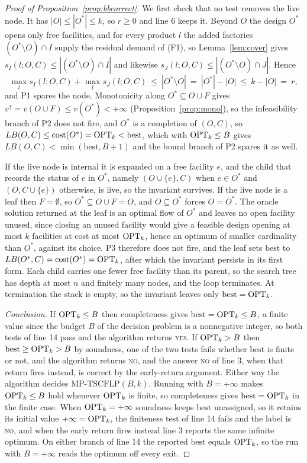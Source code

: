 \begin{proof}[Proof of Proposition~\ref{prop:bbcorrect}]
We first check that no test removes the live node. It has
$|O|\le|O^\ast|\le k$, so $r\ge 0$ and line 6 keeps it. Beyond $O$ the
design $O^\ast$ opens only free facilities, and for every product $l$
the added factories $(O^\ast\setminus O)\cap I$ supply the residual
demand of (F1), so Lemma~\ref{lem:cover} gives
$s_I(l;O,C)\le|(O^\ast\setminus O)\cap I|$ and likewise
$s_J(l;O,C)\le|(O^\ast\setminus O)\cap J|$. Hence
\[
\max_l s_I(l;O,C)+\max_l s_J(l;O,C)\ \le\ |O^\ast\setminus O|
\ =\ |O^\ast|-|O|\ \le\ k-|O|\ =\ r,
\]
and P1 spares the node. Monotonicity along $O^\ast\subseteq O\cup F$
gives $v^{\uparrow}=v(O\cup F)\le v(O^\ast)<+\infty$
(Proposition~\ref{prop:mono}), so the infeasibility branch of P2 does
not fire, and $O^\ast$ is a completion of $(O,C)$, so
$LB(O,C)\le\mathrm{cost}(O^\ast)=\mathrm{OPT}_k<\mathrm{best}$, which with
$\mathrm{OPT}_k\le B$ gives $LB(O,C)<\min(\mathrm{best},B+1)$ and the bound
branch of P2 spares it as well.

If the live node is internal it is expanded on a free facility $e$, and
the child that records the status of $e$ in $O^\ast$, namely
$(O\cup\{e\},C)$ when $e\in O^\ast$ and $(O,C\cup\{e\})$ otherwise, is
live, so the invariant survives. If the live node is a leaf then
$F=\emptyset$, so $O^\ast\subseteq O\cup F=O$, and $O\subseteq O^\ast$
forces $O=O^\ast$. The oracle solution returned at the leaf is an
optimal flow of $O^\ast$ and leaves no open facility
unused, since closing an unused facility would give a feasible design
opening at most $k$ facilities at cost at most $\mathrm{OPT}_k$, hence an
optimum of smaller cardinality than $O^\ast$, against its choice. P3
therefore does not fire, and the leaf sets $\mathrm{best}$ to
$LB(O^\ast,C)=\mathrm{cost}(O^\ast)=\mathrm{OPT}_k$, after which the invariant
persists in its first form. Each child carries one fewer free facility
than its parent, so the search tree has depth at most $n$ and finitely
many nodes, and the loop terminates. At termination the stack is empty,
so the invariant leaves only $\mathrm{best}=\mathrm{OPT}_k$.

\emph{Conclusion.} If $\mathrm{OPT}_k\le B$ then completeness gives
$\mathrm{best}=\mathrm{OPT}_k\le B$, a finite value since the budget $B$ of the
decision problem is a nonnegative integer, so both tests of line 14 pass
and the algorithm returns \textsc{yes}. If $\mathrm{OPT}_k>B$ then
$\mathrm{best}\ge\mathrm{OPT}_k>B$ by soundness, one of the two tests fails
whether $\mathrm{best}$ is finite or not, and the algorithm returns
\textsc{no}, and the answer \textsc{no} of line 3, when that return
fires instead, is correct by the early-return argument. Either
way the algorithm decides $\mathrm{MP\text{-}TSCFLP}(B,k)$. Running with
$B=+\infty$ makes $\mathrm{OPT}_k\le B$ hold whenever $\mathrm{OPT}_k$ is finite, so
completeness gives $\mathrm{best}=\mathrm{OPT}_k$ in the finite case. When
$\mathrm{OPT}_k=+\infty$ soundness keeps $\mathrm{best}$ unassigned, so it
retains its initial value $+\infty=\mathrm{OPT}_k$, the finiteness test of
line 14 fails and the label is \textsc{no}, and when the early return
fires instead line 3 reports the same infinite optimum. On either
branch of line 14 the reported $\mathrm{best}$ equals $\mathrm{OPT}_k$, so the
run with $B=+\infty$ reads the optimum off every exit.
\end{proof}

